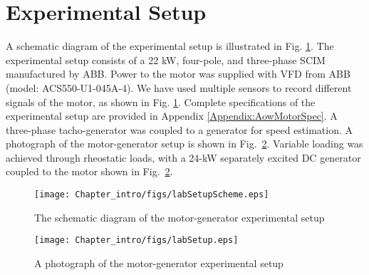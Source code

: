 \section{Experimental Setup}
\label{experimentalSetup}
A schematic diagram of the experimental setup is illustrated in Fig. \ref{Fig:labSetupSchematic}. The experimental setup consists of a 22 kW, four-pole, and three-phase SCIM manufactured by ABB. Power to the motor was supplied with VFD from ABB (model: ACS550-U1-045A-4). We have used multiple sensors to record different signals of the motor, as shown in Fig. \ref{Fig:labSetupSchematic}. Complete specifications of the experimental setup are provided in Appendix \ref{Appendix:AowMotorSpec}. A three-phase tacho-generator was coupled to a generator for speed estimation. A photograph of the motor-generator setup is shown in Fig.~\ref{Fig:labSetup}. Variable loading was achieved through rheostatic loads, with a 24-kW separately excited DC generator coupled to the motor shown in Fig.~\ref{Fig:labSetup}.
%
\begin{figure}[h] \centering
	{\texttt{[image: Chapter\_intro/figs/labSetupScheme.eps]}} \caption{The schematic diagram of the motor-generator experimental setup} 
	\label{Fig:labSetupSchematic}
\end{figure}
%
\begin{figure}[h] \centering
	{\texttt{[image: Chapter\_intro/figs/labSetup.eps]}} \caption{A photograph of the motor-generator experimental setup} \label{Fig:labSetup}
\end{figure}

